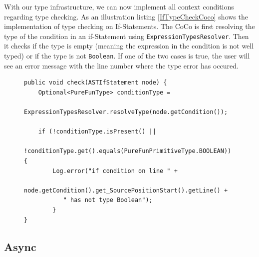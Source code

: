 With our type infrastructure, we can now implement all context conditions regarding type checking. As an illustration listing \ref{IfTypeCheckCoco} shows the implementation of type checking on If-Statements. The CoCo is first resolving the type of the condition in an if-Statement using \texttt{ExpressionTypesResolver}. Then it checks if the type is empty (meaning the expression in the condition is not well typed) or if the type is not \texttt{Boolean}. If one of the two cases is true, the user will see an error message with the line number where the type error has occured.

\begin{figure}[h]
\begin{lstlisting}[caption={Implementation of If-Statement type checking CoCo},label={IfTypeCheckCoco}]
public void check(ASTIfStatement node) {
    Optional<PureFunType> conditionType =
       	ExpressionTypesResolver.resolveType(node.getCondition());

    if (!conditionType.isPresent() ||
        	!conditionType.get().equals(PureFunPrimitiveType.BOOLEAN)) {
        Log.error("if condition on line " + 
           node.getCondition().get_SourcePositionStart().getLine() + 
           " has not type Boolean");
        }
}
\end{lstlisting}
\end{figure}

\subsection{Async}
